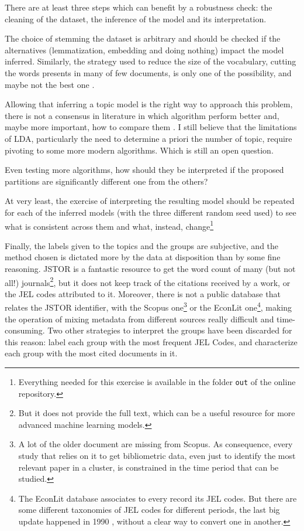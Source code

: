 \documentclass[a4paper, 11pt, headings=standardclasses, tablecaptionsbelow]{scrartcl}
\begin{document}
There are at least three steps which can benefit by a robustness check: the cleaning of the dataset, the inference of the model and its interpretation.

The choice of stemming the dataset is arbitrary and should be checked if the alternatives (lemmatization, embedding and doing nothing) impact the model inferred.
Similarly, the strategy used to reduce the size of the vocabulary, cutting the words presents in many of few documents, is only one of the possibility, and maybe not the best one \parencite{gerlach2019}.

Allowing that inferring a topic model is the right way to approach this problem, there is not a consensus in literature in which algorithm perform better and, maybe more important, how to compare them \parencite[a recent and rare attempt is][]{shi2019}. I still believe that the limitations of LDA, particularly the need to determine a priori the number of topic, require pivoting to some more modern algorithms. Which is still an open question.

Even testing more algorithms, how should they be interpreted if the proposed partitions are significantly different one from the others?

At very least, the exercise of interpreting the resulting model should be repeated for each of the inferred models (with the three different random seed used) to see what is consistent across them and what, instead, change\footnote{Everything needed for this exercise is available in the folder \texttt{out} of the online repository.}

Finally, the labels given to the topics and the groups are subjective, and the method chosen is dictated more by the data at disposition than by some fine reasoning.
JSTOR is a fantastic resource to get the word count of many (but not all!) journals\footnote{But it does not provide the full text, which can be a useful resource for more advanced machine learning models.}, but it does not keep track of the citations received by a work, or the JEL codes attributed to it. Moreover, there is not a public database that relates the JSTOR identifier, with the Scopus one\footnote{A lot of the older document are missing from Scopus. As consequence, every study that relies on it to get bibliometric data, even just to identify the most relevant paper in a cluster, is constrained in the time period that can be studied.} or the EconLit one\footnote{The EconLit database associates to every record its JEL codes. But there are some different taxonomies of JEL codes for different periods, the last big update happened in 1990 \parencite{cherrier2017}, without a clear way to convert one in another.}, making the operation of mixing metadata from different sources really difficult and time-consuming.
Two other strategies to interpret the groups have been discarded for this reason: label each group with the most frequent JEL Codes, and characterize each group with the most cited documents in it.
\end{document}

